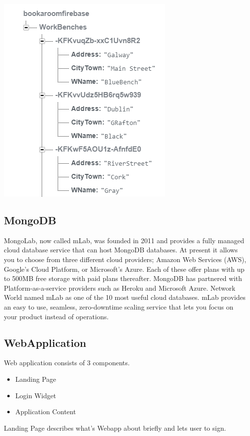 \begin{itemize}
\begin{center}    
	\includegraphics{img/Firebase.png}
\end{center}

\subsection{MongoDB}
\bigbreak
MongoLab, now called mLab, was founded in 2011 and provides a fully managed cloud database service that can host MongoDB databases. At present it allows you to choose from three different cloud providers; Amazon Web Services (AWS), Google's Cloud Platform, or Microsoft's Azure. Each of these offer plans with up to 500MB free storage with paid plans thereafter. MongoDB has partnered with Platform-as-a-service providers such as Heroku and Microsoft Azure. Network World named mLab as one of the 10 most useful cloud databases. mLab provides an easy to use, seamless, zero-downtime scaling service that lets you focus on your product instead of operations.
\subsection{WebApplication}

Web application consists of 3 components.
\begin{itemize}
	\item Landing Page
	\item Login Widget
	\item Application Content 
\end{itemize}
\bigbreak
\bigbreak
Landing Page describes what's Webapp about briefly and lets user to sign.


\end{itemize}
